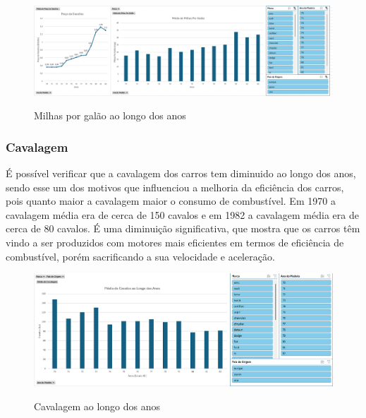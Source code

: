 \documentclass[a4paper]{article}
\begin{document}
\begin{figure}[h!]
    \raggedright
    \includegraphics[width=1.2\textwidth]{Recursos/MilhasPorGalaoGrafico.png} %
    \vspace{0.5cm}
    \label{fig:mpg}
    \caption{Milhas por galão ao longo dos anos}
\end{figure}
\newpage



\subsubsection{Cavalagem}
É possível verificar que a cavalagem dos carros tem diminuido ao longo dos anos, sendo esse um dos motivos
que influenciou a melhoria da eficiência dos carros, pois quanto maior a cavalagem maior o consumo de combustível.
Em 1970 a cavalagem média era de cerca de 150 cavalos e em 1982 a cavalagem média era de cerca de 80 cavalos.
É uma diminuição significativa, que mostra que os carros têm vindo a ser produzidos com motores mais eficientes em termos
de eficiência de combustível, porém sacrificando a sua velocidade e aceleração.

\begin{figure}[h!]
    \centering
    \includegraphics[width=1\textwidth]{Recursos/CavalagemGrafico.png} %
    \vspace{0.5cm}
    \label{fig:cavg}
    \caption{Cavalagem ao longo dos anos}
\end{figure}
\end{document}
